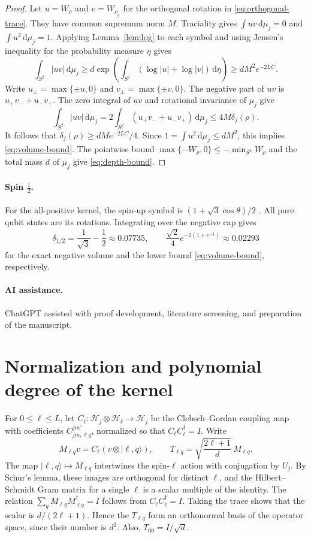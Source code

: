 \documentclass[11pt,a4paper]{article}
\newcommand{\dd}{\,\mathrm{d}}
\begin{document}
\begin{proof}
Let \(u=W_\rho\) and \(v=W_{\rho_g}\) for the orthogonal rotation
in \eqref{eq:orthogonal-trace}. They have common supremum norm \(M\).
Traciality gives \(\int uv\dd\mu_j=0\) and
\(\int u^2\dd\mu_j=1\). Applying Lemma~\ref{lem:log} to each
symbol and using Jensen's inequality for the probability measure
\(\eta\) gives
\[
  \int_{S^2}|uv|\dd\mu_j
  \geq d\exp\left(\int_{S^2}(\log|u|+\log|v|)\dd\eta\right)
  \geq d M^2 e^{-2LC}.
\]
Write \(u_\pm=\max\{\pm u,0\}\) and \(v_\pm=\max\{\pm v,0\}\).
The negative part of \(uv\) is \(u_+v_-+u_-v_+\). The zero integral
of \(uv\) and rotational invariance of \(\mu_j\) give
\[
  \int_{S^2}|uv|\dd\mu_j
  =2\int_{S^2}(u_+v_-+u_-v_+)\dd\mu_j
  \leq 4M\delta_j(\rho).
\]
It follows that \(\delta_j(\rho)\geq d M e^{-2LC}/4\).
Since \(1=\int u^2\dd\mu_j\leq d M^2\), this implies
\eqref{eq:volume-bound}. The pointwise bound
\(\max\{-W_\rho,0\}\leq-\min_{S^2}W_\rho\) and the total mass
\(d\) of \(\mu_j\) give \eqref{eq:depth-bound}.
\end{proof}

\paragraph{Spin \(\tfrac12\).}
For the all-positive kernel, the spin-up symbol is
\((1+\sqrt{3}\cos\theta)/2\) \cite[Eq.~(16)]{davis2021}.
All pure qubit states are its rotations. Integrating over the
negative cap gives
\[
  \delta_{1/2}=\frac{1}{\sqrt{3}}-\frac12\approx0.07735,
  \qquad
  \frac{\sqrt{2}}4 e^{-2(1+e^{-1})}\approx0.02293
\]
for the exact negative volume and the lower bound
\eqref{eq:volume-bound}, respectively.

\paragraph{AI assistance.}
ChatGPT assisted with proof development, literature screening, and
preparation of the manuscript.

\appendix
\section{Normalization and polynomial degree of the kernel}
\label{app:kernel}

For \(0\leq\ell\leq L\), let
\(C_\ell:\mathcal H_j\otimes\mathcal H_\ell\to\mathcal H_j\)
be the Clebsch--Gordan coupling map with coefficients
\(C_{jm,\ell q}^{jm'}\), normalized so that
\(C_\ell C_\ell^\dagger=I\). Write
\[
  M_{\ell q}v=C_\ell(v\otimes|\ell,q\rangle),\qquad
  T_{\ell q}=\sqrt{\frac{2\ell+1}{d}}\,M_{\ell q}.
\]
The map \(|\ell,q\rangle\mapsto M_{\ell q}\) intertwines the
spin-\(\ell\) action with conjugation by \(U_j\).
By Schur's lemma, these images are orthogonal for distinct \(\ell\),
and the Hilbert--Schmidt Gram matrix for a single \(\ell\) is a
scalar multiple of the identity. The relation
\(\sum_q M_{\ell q}M_{\ell q}^\dagger=I\) follows from
\(C_\ell C_\ell^\dagger=I\). Taking the trace shows that the scalar
is \(d/(2\ell+1)\). Hence the \(T_{\ell q}\) form an orthonormal
basis of the operator space, since their number is \(d^2\).
Also, \(T_{00}=I/\sqrt d\).
\end{document}
